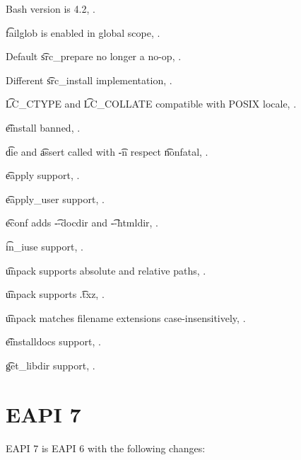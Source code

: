 \begin{compactitem}
\item Bash version is 4.2, .
\item \t{failglob} is enabled in global scope, .
\item Default \t{src_prepare} no longer a no-op, .
\item Different \t{src_install} implementation, .
\item \t{LC_CTYPE} and \t{LC_COLLATE} compatible with POSIX locale, .
\item \t{einstall} banned, .
\item \t{die} and \t{assert} called with \t{-n} respect \t{nonfatal}, .
\item \t{eapply} support, .
\item \t{eapply_user} support, .
\item \t{econf} adds \t{-{}-docdir} and \t{-{}-htmldir}, .
\item \t{in_iuse} support, .
\item \t{unpack} supports absolute and relative paths, .
\item \t{unpack} supports \t{.txz}, .
\item \t{unpack} matches filename extensions case-insensitively, .
\item \t{einstalldocs} support, .
\item \t{get_libdir} support, .
\end{compactitem}

\section{EAPI 7}

EAPI 7 is EAPI 6 with the following changes:

